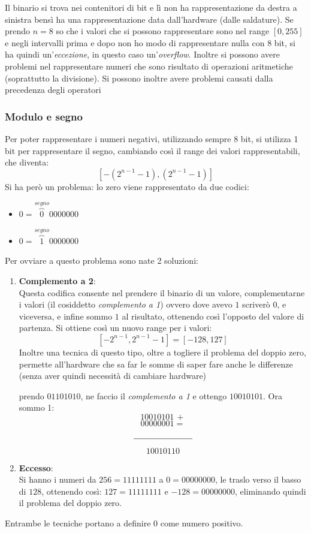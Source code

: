 \documentclass[a4paper,12pt, oneside]{book}
\begin{document}
Il binario si trova nei contenitori di bit e lì non ha rappresentazione da destra a sinistra bensì ha una rappresentazione data dall'hardware (dalle saldature).
Se prendo $n=8$ so che i valori che si possono rappresentare sono nel range $[0,255]$ e negli intervalli prima e dopo non ho modo di rappresentare nulla con 8 bit, si ha quindi un'\textit{eccezione}, in questo caso un'\textit{overflow}. Inoltre si possono avere problemi nel rappresentare numeri che sono risultato di operazioni aritmetiche (soprattutto la divisione). Si possono inoltre avere problemi causati dalla precedenza degli operatori
\subsubsection{Modulo e segno}
Per poter rappresentare i numeri negativi, utilizzando sempre 8 bit, si utilizza 1 bit per rappresentare il segno, cambiando così il range dei valori rappresentabili, che diventa:
$$[-(2^{n-1}-1),(2^{n-1}-1)]$$
Si ha però un problema: lo zero viene rappresentato da due codici:
\begin{itemize}
\item $0=\overbrace{0}^{segno}0000000$
\item $0=\overbrace{1}^{segno}0000000$
\end{itemize}
Per ovviare a questo problema sono nate 2 soluzioni:
\begin{enumerate}
\item \textbf{Complemento a 2}:\\
Questa codifica consente nel prendere il binario di un valore, complementarne i valori (il cosiddetto \textit{complemento a 1}) ovvero dove avevo $1$ scriverò $0$, e viceversa, e infine sommo $1$ al risultato, ottenendo così l'opposto del valore di partenza. Si ottiene così un nuovo range per i valori:
$$[-2^{n-1},2^{n-1}-1]=[-128,127]$$
Inoltre una tecnica di questo tipo, oltre a togliere il problema del doppio zero, permette all'hardware che sa far le somme di saper fare anche le differenze (senza aver quindi necessità di cambiare hardware)
\begin{esempio}
prendo $01101010$, ne faccio il \textit{complemento a 1} e ottengo $10010101$. Ora sommo 1:
$$10010101 \, +$$
$$00000001=$$
$$\rule{70pt}{.4pt}$$
$$10010110$$
\end{esempio}
\item \textbf{Eccesso}:\\
Si hanno i numeri da $256=11111111$ a $0=00000000$, le traslo verso il basso di $128$, ottenendo così: $127=11111111$ e $-128=00000000$, eliminando quindi il problema del doppio zero.
\end{enumerate}
Entrambe le tecniche portano a definire 0 come numero positivo.
\end{document}
